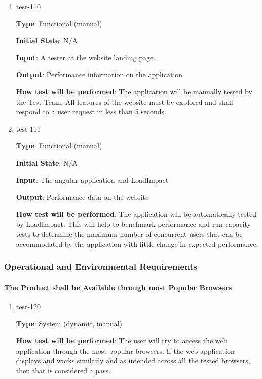 \documentclass[12pt, titlepage]{article}
\begin{document}
\begin{enumerate}

\item{test-110\\}

\textbf{Type}: Functional (manual)
					
\textbf{Initial State}: N/A
					
\textbf{Input}: A tester at the website landing page.
					
\textbf{Output}: Performance information on the application
					
\textbf{How test will be performed}: The application will be manually tested by the Test Team. All features of the website must be explored and shall respond to a user request in less than 5 seconds.
					
\item{test-111\\}

\textbf{Type}: Functional (manual)
					
\textbf{Initial State}: N/A
					
\textbf{Input}: The angular application and LoadImpact
					
\textbf{Output}: Performance data on the website
					
\textbf{How test will be performed}: The application will be automatically tested by LoadImpact. This will help to benchmark performance and run capacity tests to determine the maximum number of concurrent users that can be accommodated by the application with little change in expected performance.

\end{enumerate}


\subsubsection{Operational and Environmental Requirements}
		
\paragraph{The Product shall be Available through most Popular Browsers}

\begin{enumerate}

\item{test-120\\}

\textbf{Type}: System (dynamic, manual)
					
\textbf{How test will be performed}: The user will try to access the web application through the most popular browsers. If the web application displays and works similarly and as intended across all the tested browsers, then that is considered a pass.
				
\end{enumerate}
\end{document}
